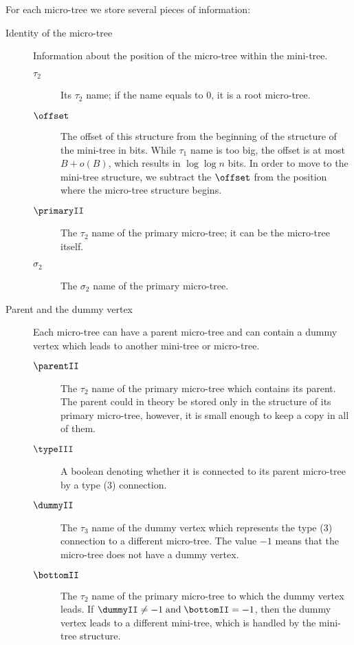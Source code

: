 For each micro-tree we store several pieces of information:
\begin{description}
	\item[Identity of the micro-tree]
	Information about the position of the micro-tree within the mini-tree.
	\begin{description}
		\item[$\tau_2$]
		Its $\tau_2$ name; if the name equals to $0$, it is a root micro-tree.
		
		\item[$\offset$]
		The offset of this structure from the beginning of the structure of the mini-tree in bits.
		While $\tau_1$ name is too big, the offset is at most $B + o(B)$, which results in $\log \log n$ bits.
		In order to move to the mini-tree structure, we subtract the $\offset$ from the position where the micro-tree structure begins.
		
		\item[$\primaryII$]
		The $\tau_2$ name of the primary micro-tree; it can be the micro-tree itself.
		
		\item[$\sigma_2$]
		The $\sigma_2$ name of the primary micro-tree.
	\end{description}

	\item[Parent and the dummy vertex]
	Each micro-tree can have a parent micro-tree and can contain a dummy vertex which leads to another mini-tree or micro-tree.
	\begin{description}
		\item[$\parentII$]
		The $\tau_2$ name of the primary micro-tree which contains its parent.
		The parent could in theory be stored only in the structure of its primary micro-tree, however, it is small enough to keep a copy in all of them.
		
		\item[$\typeIII$]
		A boolean denoting whether it is connected to its parent micro-tree by a type (3) connection.
		
		\item[$\dummyII$]
		The $\tau_3$ name of the dummy vertex which represents the type (3) connection to a different micro-tree.
		The value $-1$ means that the micro-tree does not have a dummy vertex.
		
		\item[$\bottomII$]
		The $\tau_2$ name of the primary micro-tree to which the dummy vertex leads.
		If $\dummyII \ne -1 \booland \bottomII = -1$, then the dummy vertex leads to a different mini-tree, which is handled by the mini-tree structure.
	\end{description}
	

\end{description}
